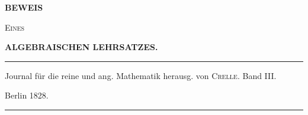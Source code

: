 \clearpage
{}
\thispagestyle{empty}
\begin{center}
\vspace*{2cm}
{\Large\bfseries BEWEIS}\par
\vspace{1cm}
\textsc{Eines}\par
\vspace{1cm}
{\Large\bfseries ALGEBRAISCHEN LEHRSATZES.}\par
\vspace{3cm}
\rule{0.85\linewidth}{0.4pt}\par\medskip
Journal für die reine und ang. Mathematik herausg. von \textsc{Crelle}. Band III.\par
\medskip Berlin 1828.\par\medskip
\rule{0.85\linewidth}{0.4pt}
\end{center}
\clearpage
